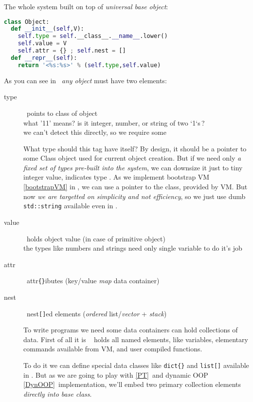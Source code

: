 \label{Object}\secdown

The whole system built on top of \emph{universal base object}: 

\begin{lstlisting}[language=Python]
class Object:
  def __init__(self,V):
    self.type = self.__class__.__name__.lower()
    self.value = V
    self.attr = {} ; self.nest = []
  def __repr__(self):
    return '<%s:%s>' % (self.type,self.value)
\end{lstlisting}

\noindent
As you can see in \cite{budd}\ \emph{any object} must have two elements:
\begin{description}%
\item[type]\ points to class of object\\
what '11' means? is it integer, number, or string of two `1`s\,?\\
we can't detect this directly, so we require some 

What type should this tag have itself? By design, it should be a pointer to some
Class object used for current object creation. But if we need only \emph{a fixed
set of types pre-built into the system}, we can downsize it just to tiny integer
value, indicates type \cite{STFPGA}. As we implement bootstrap VM
\ref{bootstrapVM} in \py, we can use a pointer to the class, provided by \py
VM. But now \emph{we are targetted on simplicity and not efficiency}, so we just
use dumb \verb|std::string| available even in \cpp.

\item[value]\ holds object value (in case of primitive object)\ \\
the  types like numbers and strings need only single variable to
do it's job

\item[attr]\ attr\verb|{}|ibutes (key/value \emph{map} data container)
\item[nest]\ nest\verb|[]|ed elements (\textit{ordered} list/\emph{vector} +
\emph{stack})

To write programs we need some  data containers can hold
collections of data. First of all it is \F\  holds all named
elements, like variables, elementary commands available from VM, and user
compiled functions.

To do it we can define special data classes like \verb|dict{}| and \verb|list[]|
available in \py. But as we are going to play with  \ref{PT}\ and dynamic OOP \ref{DynOOP}\ implementation, we'll
embed two primary collection elements \emph{directly into base class}.
 
\end{description}

